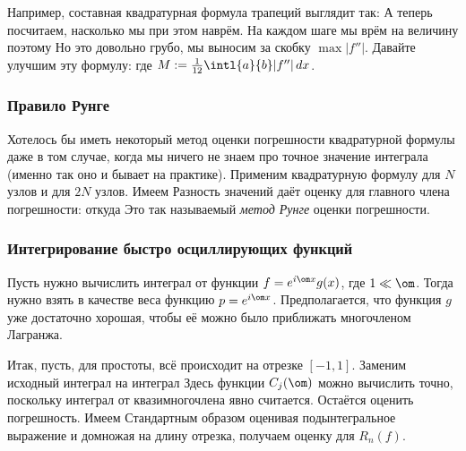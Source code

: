 \documentclass[a4paper]{article}
\begin{document}
Например, составная квадратурная формула трапеций выглядит так:
  А теперь посчитаем, насколько
мы при этом наврём. На каждом шаге мы врём на величину  поэтому 
Но это довольно грубо, мы выносим за скобку $\max |f''|$. Давайте
улучшим эту формулу:  где $M :=
\frac{1}{12}\intl{a}{b}|f''|\dx$.

\subsubsection{Правило Рунге}

Хотелось бы иметь некоторый метод оценки погрешности квадратурной
формулы даже в том случае, когда мы ничего не знаем про точное
значение интеграла (именно так оно и бывает на практике).  Применим
квадратурную формулу для $N$ узлов и для $2N$ узлов.  Имеем
  Разность значений
даёт оценку для главного члена погрешности:  откуда   Это так называемый \emph{метод Рунге} оценки
погрешности.


\subsubsection{Интегрирование быстро осциллирующих функций}

Пусть нужно вычислить интеграл от функции $f = e^{i\om x }g(x)$, где
$1 \ll \om$. Тогда нужно взять в качестве веса функцию $p = e^{i\om
  x}$. Предполагается, что функция $g$ уже достаточно хорошая, чтобы
её можно было приближать многочленом Лагранжа.

Итак, пусть, для простоты, всё происходит на отрезке $[-1,1]$.
Заменим исходный интеграл  на интеграл
  Здесь функции $C_j(\om)$ можно вычислить точно,
поскольку интеграл от квазимногочлена явно считается.  Остаётся
оценить погрешность. Имеем   Стандартным образом оценивая подынтегральное
выражение и домножая на длину отрезка, получаем оценку для $R_n(f)$.
\end{document}
